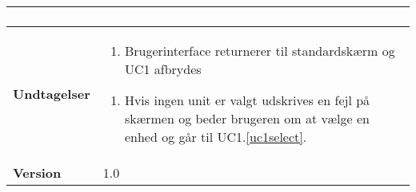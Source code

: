 \begin{table}[H]
\begin{tabular} {|p{6cm}|p{8cm}|}
\begin{enumerate}
			\end{enumerate}\\\hline
		
		\textbf{Undtagelser}					
		&\begin{enumerate}[label= \ref{uc1ex1}a.]
			\item Brugerinterface returnerer til standardskærm og UC1 afbrydes
		\end{enumerate}
											
		\begin{enumerate}[label= \ref{uc1ex2}a.]
			\item Hvis ingen unit er valgt udskrives en fejl på skærmen og beder brugeren om at vælge en enhed og går til UC1.\ref{uc1select}.
		\end{enumerate} \\\hline
											
		\textbf{Version}		&1.0 \\\hline

	\end{tabular}
	\label{UC1} 
\end{table}